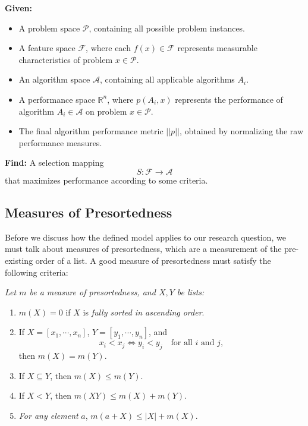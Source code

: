 \documentclass[twocolumn]{article}
\renewcommand{\leq}{\leqslant}
\newcommand{\vsp}{\vspace{0.5em}}
\begin{document}
\vsp

\noindent\textbf{Given:}
\begin{itemize}[itemsep=0.05em, topsep=0pt, leftmargin=1em]
    \item A problem space $\mathcal{P}$, containing all possible problem instances.
    \item A feature space $\mathcal{F}$, where each $f(x)\in\mathcal{F}$ represents measurable characteristics of problem $x\in\mathcal{P}$.
    \item An algorithm space $\mathcal{A}$, containing all applicable algorithms $A_i$.
    \item A performance space $\mathbb{R}^n$, where $p(A_i,x)$ represents the performance of algorithm $A_i\in\mathcal{A}$ on problem $x\in\mathcal{P}$.
    \item The final algorithm performance metric $||p||$, obtained by normalizing the raw performance measures.
\end{itemize}

\noindent\textbf{Find:} A selection mapping 
\[
S:\mathcal{F}\rightarrow\mathcal{A}
\]
that maximizes performance according to some criteria.

\subsection{Measures of Presortedness}
Before we discuss how the defined model applies to our research question, we must talk about measures of presortedness, which are a measurement of the pre-existing order of a list. A good measure of presortedness must satisfy the following criteria:

\vsp

\noindent \emph{Let $m$ be a measure of presortedness, and $X, Y$ be lists:}
\begin{enumerate}[itemsep=0.05em, topsep=0pt]
    \item $m(X) = 0$ if $X$ is \emph{fully sorted in ascending order}.
    \item If $X = [x_1, \cdots, x_n]$, $Y= [y_1, \cdots, y_n]$, and 
    \[
    x_i < x_j \iff y_i < y_j \quad \text{for all } i \text{ and } j,
    \]
    then $m(X) = m(Y)$.
    \item If $X \subseteq Y$, then $m(X) \leq m(Y)$.
    \item If $X < Y$, then $m(XY) \leq m(X) + m(Y)$.
    \item \emph{For any element} $a$, $m(a + X) \leq |X| + m(X)$.
\end{enumerate}
\end{document}
